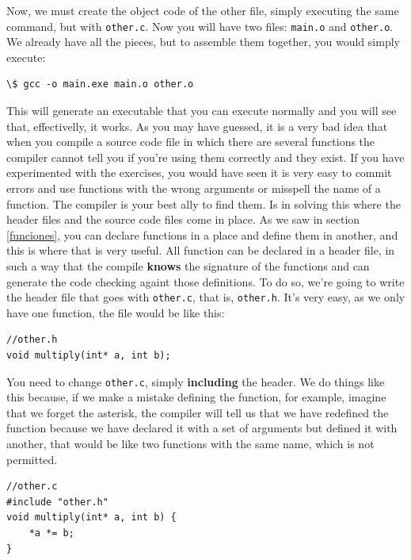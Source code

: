 \documentclass[a4paper]{article}
\begin{document}
Now, we must create the object code of the other file, simply executing the same
command, but with \verb!other.c!. Now you will have two files: \verb!main.o! and
\verb!other.o!. We already have all the pieces, but to assemble them together,
you would simply execute:
\begin{lstlisting}[style=terminalStyle]
\$ gcc -o main.exe main.o other.o
\end{lstlisting}

This will generate an executable that you can execute normally and you will see
that, effectivelly, it works. As you may have guessed, it is a very bad idea
that when you compile a source code file in which there are several functions
the compiler cannot tell you if you're using them correctly and they exist.
If you have experimented with the exercises, you would have seen it is very easy
to commit errors and use functions with the wrong arguments or misspell the name
of a function. The compiler is your best ally to find them. Is in solving this
where the header files and the source code files come in place. As we saw in
section \ref{funciones}, you can declare functions in a place and define them in
another, and this is where that is very useful. All function can be declared in
a header file, in such a way that the compile \textbf{knows} the signature of
the functions and can generate the code checking againt those definitions.
To do so, we're going to write the header file that goes with \verb!other.c!,
that is, \verb!other.h!. It's very easy, as we only have one function, the file
would be like this:

\noindent
\begin{minipage}[H]{\linewidth}
\mbox{}
\begin{lstlisting}[style=C,
caption={Header file},
label={lst:headerFile}]
//other.h
void multiply(int* a, int b);
\end{lstlisting}
\end{minipage}

You need to change \verb!other.c!, simply \textbf{including} the header. We do
things like this because, if we make a mistake defining the function, for
example, imagine that we forget the asterisk, the compiler will tell us that
we have redefined the function because we have declared it with a set of
arguments but defined it with another, that would be like two functions with
the same name, which is not permitted.

\noindent
\begin{minipage}[H]{\linewidth}
\mbox{}
\begin{lstlisting}[style=C,
caption={Definition file with included header},
label={lst:fileCofHeader}]
//other.c
#include "other.h"
void multiply(int* a, int b) {
    *a *= b;
}
\end{lstlisting}
\end{minipage}
\end{document}
